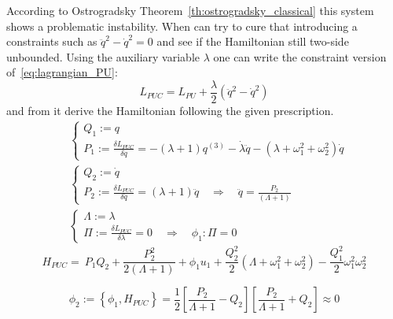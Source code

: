 According to Ostrogradsky Theorem~\ref{th:ostrogradsky_classical} this system
shows a problematic instability. When can try to cure that introducing a
constraints such as $\ddot{q}^2 - \dot{q}^2 = 0$ and see if the Hamiltonian
still two-side unbounded. Using the auxiliary variable $\lambda$ one can write
the constraint version of~\eqref{eq:lagrangian_PU}:
\begin{equation} \label{eq:lagrangian_PUC}
  L_{PUC} = L_{PU} + \frac{\lambda}{2} \left(\ddot{q}^2 - \dot{q}^2\right)
\end{equation}
and from it derive the Hamiltonian following the given prescription.
\begin{align*}
  & \begin{cases}
    Q_1 := q \\
    P_1 := \frac{\delta L_{PUC}}{\delta \dot{q}} =
        - (\lambda + 1) q^{(3)} - \dot{\lambda}\ddot{q}
        - (\lambda + \omega_1^2 + \omega_2^2)\dot{q}
  \end{cases} \\
  & \begin{cases}
    Q_2 := \dot{q} \\
    P_2 := \frac{\delta L_{PUC}}{\delta \ddot{q}} =
        (\lambda + 1) \ddot{q}
        \quad  \Rightarrow \quad \ddot{q} = \frac{P_2}{(\Lambda + 1)}
  \end{cases} \\
  & \begin{cases}
    \Lambda := \lambda \\
    \Pi := \frac{\delta L_{PUC}}{\delta \lambda} = 0
        \quad  \Rightarrow \quad \phi_1: \Pi = 0
  \end{cases}
\end{align*}
\begin{equation} \label{eq:ham_PUC_with_aux_vars}
   H_{PUC} =\ P_1 Q_2 + \frac{P_2^2}{2(\Lambda + 1)} + \phi_1 u_1
  + \frac{Q_2^2}{2} \left(\Lambda + \omega_1^2 + \omega_2^2 \right)
  - \frac{Q_1^2}{2} \omega_1^2 \omega_2^2
\end{equation}

\begin{equation} \label{eq:secondary_constraint_PU}
  \phi_2 :=
  \left\{ \phi_1, H_{PUC} \right\} =
  \frac{1}{2} \left[ \frac{P_2}{\Lambda + 1} - Q_2 \right]
  \left[ \frac{P_2}{\Lambda + 1} + Q_2 \right]
  \approx 0
\end{equation}

